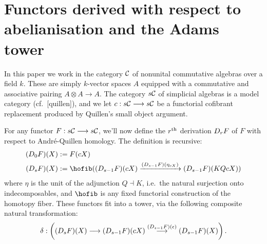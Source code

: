 \documentclass[11pt]{amsart}
\theoremstyle{plain}
\newcommand{\dupdown}[2]{D_{\smash{#1}}}
\begin{document}
\section{Functors derived with respect to abelianisation and the Adams tower}\label{sec:derWRTab}
In this paper we work in the category $\mathcal{C}$ of nonunital commutative algebras over a field $k$. These are simply $k$-vector spaces $A$ equipped with a commutative and associative pairing $A\otimes A\to A$. The category $s\mathcal{C}$ of simplicial algebras is a model category (cf.\ [quillen]), and we let $c:s\mathcal{C}\longrightarrow s\mathcal{C}$ be a functorial cofibrant replacement produced by Quillen's small object argument.




For any functor $F:s\mathcal{C}\longrightarrow s\mathcal{C}$, we'll now define the $r^\textup{th}$ derivation $\dupdown{r}{b}F$ of $F$ with respect to Andr\'e-Quillen homology. The definition is recursive:
\begin{alignat*}{2}
(\dupdown{0}{b}F)(X)
&:=
F(cX)%
\\
(\dupdown{s}{b}F)(X)
&:=
\hofib((\dupdown{s-1}{c}F)(cX)\xrightarrow{(\dupdown{s-1}{c}F)(\eta_{cX})} (\dupdown{s-1}{c}F)(KQcX))
\end{alignat*}
where $\eta$ is the unit of the adjunction $Q\dashv K$, i.e.\ the natural surjection onto indecomposables, and $\hofib$ is any fixed  functorial construction of the homotopy fiber. These functors fit into a tower, via the following composite natural transformation:
\[\delta:\left((\dupdown{s}{c}F)(X)\to (\dupdown{s-1}{c}F)(cX)\overset{(\dupdown{s-1}{c}F)(\epsilon)}{\to} (\dupdown{s-1}{c}F)(X)\right).\]
\end{document}
